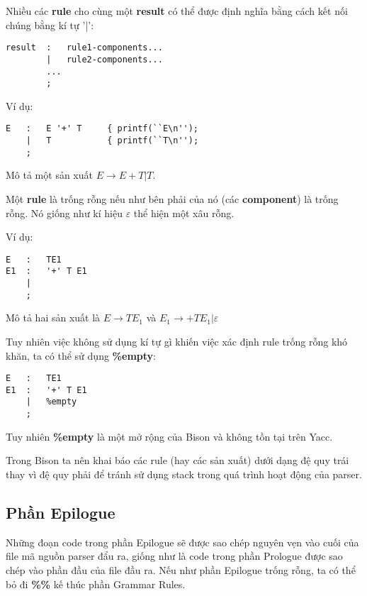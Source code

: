 \documentclass[../report.tex]{subfiles}
\begin{document}
Nhiều các \textbf{rule} cho cùng một \textbf{result} có thể được 
định nghĩa bằng cách kết nối chúng bằng kí tự '|':
\begin{lstlisting}
result  :   rule1-components...
        |   rule2-components...
        ...
        ;
\end{lstlisting}
Ví dụ: 
\begin{lstlisting}
E   :   E '+' T     { printf(``E\n'');
    |   T           { printf(``T\n'');
    ;
\end{lstlisting}
Mô tả một sản xuất $E \rightarrow E + T | T$.

Một \textbf{rule} là trống rỗng nếu như bên phải của nó (các 
\textbf{component}) là trống rỗng. 
\cite{empty-rules}
Nó giống như kí hiệu $\varepsilon$ thể hiện một xâu rỗng. 

Ví dụ:
\begin{lstlisting}
E   :   TE1
E1  :   '+' T E1
    | 
    ;
\end{lstlisting}
Mô tả hai sản xuất là 
$E \rightarrow TE_1$
và 
$E_1 \rightarrow +TE_1 | \varepsilon$

Tuy nhiên việc không sử dụng kí tự gì khiến việc xác định rule 
trống rỗng khó khăn, ta có thể sử dụng \textbf{\%empty}:
\begin{lstlisting}
E   :   TE1
E1  :   '+' T E1
    |   %empty
    ;
\end{lstlisting}
Tuy nhiên \textbf{\%empty} là một mở rộng của Bison và 
không tồn tại trên Yacc.

Trong Bison ta nên khai báo các rule (hay các sản xuất) dưới dạng 
đệ quy trái thay vì đệ quy phải để tránh sử dụng stack trong quá trình hoạt động của parser. \cite{left-recursion}

\subsection{Phần Epilogue}
Những đoạn code trong phần Epilogue sẽ được sao chép nguyên vẹn 
vào cuối của file mã nguồn parser đẩu ra, giống như là code trong
phần Prologue được sao chép vào phần đầu của file đầu ra. 
Nếu như phần Epilogue trống rỗng, ta có thể bỏ đi \textbf{\%\%} 
kế thúc phần Grammar Rules.
\end{document}

